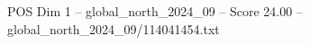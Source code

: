 \begin{textsample}{POS Dim 1 – global\_north\_2024\_09 – Score 24.00 – global\_north\_2024\_09/114041454.txt}
\end{textsample}
